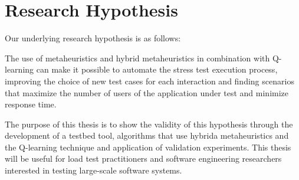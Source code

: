 \section{Research Hypothesis}

Our underlying research hypothesis is as follows:

\begin{mybox}
The use of metaheuristics and hybrid metaheuristics in combination with Q-learning can make it possible to automate the stress test execution process, improving the choice of new test cases for each interaction and finding scenarios that maximize the number of users of the application under test and minimize response time.
\end{mybox}

The purpose of this thesis is to show the validity of this hypothesis through the development of a testbed tool, algorithms that use hybrida metaheuristics and the Q-learning technique and application of validation experiments. This thesis will be useful for load test practitioners and software engineering researchers interested in testing large-scale software systems.





